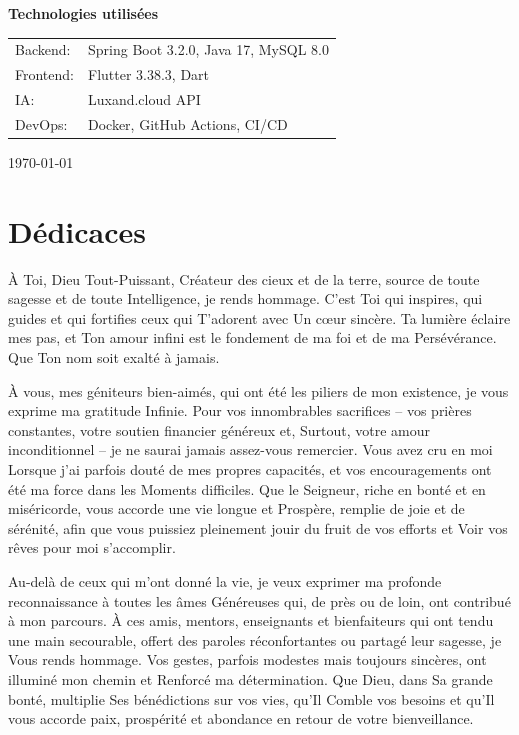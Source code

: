 \documentclass[a4paper,11pt]{report}
\begin{document}
\begin{titlepage}
    \vfill
    
    {\large \textbf{Technologies utilisées}}\\[0.3cm]
    \begin{tabular}{ll}
        Backend: & Spring Boot 3.2.0, Java 17, MySQL 8.0 \\
        Frontend: & Flutter 3.38.3, Dart \\
        IA: & Luxand.cloud API \\
        DevOps: & Docker, GitHub Actions, CI/CD \\
    \end{tabular}
    
    \vspace*{1cm}
    
    {\large \today}
\end{titlepage}

\newpage
\thispagestyle{empty}
\chapter*{Dédicaces}

À Toi, Dieu Tout-Puissant, Créateur des cieux et de la terre, source de toute sagesse et de toute Intelligence, je rends hommage. C’est Toi qui inspires, qui guides et qui fortifies ceux qui T’adorent avec Un cœur sincère. Ta lumière éclaire mes pas, et Ton amour infini est le fondement de ma foi et de ma Persévérance. Que Ton nom soit exalté à jamais.

À vous, mes géniteurs bien-aimés, qui ont été les piliers de mon existence, je vous exprime ma gratitude Infinie. Pour vos innombrables sacrifices – vos prières constantes, votre soutien financier généreux et, Surtout, votre amour inconditionnel – je ne saurai jamais assez-vous remercier. Vous avez cru en moi Lorsque j’ai parfois douté de mes propres capacités, et vos encouragements ont été ma force dans les Moments difficiles. Que le Seigneur, riche en bonté et en miséricorde, vous accorde une vie longue et Prospère, remplie de joie et de sérénité, afin que vous puissiez pleinement jouir du fruit de vos efforts et Voir vos rêves pour moi s’accomplir.

Au-delà de ceux qui m'ont donné la vie, je veux exprimer ma profonde reconnaissance à toutes les âmes Généreuses qui, de près ou de loin, ont contribué à mon parcours. À ces amis, mentors, enseignants et bienfaiteurs qui ont tendu une main secourable, offert des paroles réconfortantes ou partagé leur sagesse, je Vous rends hommage. Vos gestes, parfois modestes mais toujours sincères, ont illuminé mon chemin et Renforcé ma détermination. Que Dieu, dans Sa grande bonté, multiplie Ses bénédictions sur vos vies, qu’Il Comble vos besoins et qu’Il vous accorde paix, prospérité et abondance en retour de votre bienveillance.
\end{document}
